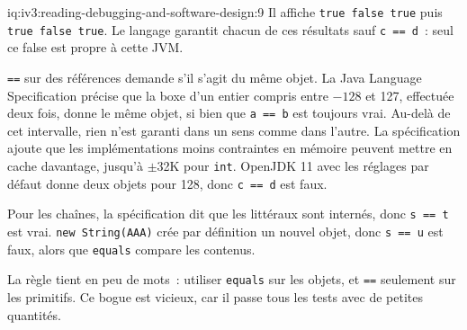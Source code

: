 \begin{solution}{iq:iv3:reading-debugging-and-software-design:9}
Il affiche \texttt{true false true} puis \texttt{true false true}. Le langage garantit chacun de ces résultats sauf \texttt{c == d}~: seul ce false est propre à cette JVM.

\texttt{==} sur des références demande s'il s'agit du même objet. La Java Language Specification précise que la boxe d'un entier compris entre $-128$ et 127, effectuée deux fois, donne le même objet, si bien que \texttt{a == b} est toujours vrai. Au-delà de cet intervalle, rien n'est garanti dans un sens comme dans l'autre. La spécification ajoute que les implémentations moins contraintes en mémoire peuvent mettre en cache davantage, jusqu'à $\pm$32K pour \texttt{int}. OpenJDK 11 avec les réglages par défaut donne deux objets pour 128, donc \texttt{c == d} est faux.

Pour les chaînes, la spécification dit que les littéraux sont internés, donc \texttt{s == t} est vrai. \texttt{new String(\textquotedbl{}AAA\textquotedbl{})} crée par définition un nouvel objet, donc \texttt{s == u} est faux, alors que \texttt{equals} compare les contenus.

La règle tient en peu de mots~: utiliser \texttt{equals} sur les objets, et \texttt{==} seulement sur les primitifs. Ce bogue est vicieux, car il passe tous les tests avec de petites quantités.


\end{solution}

